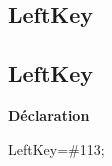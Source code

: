 \documentclass{report}
\newif\ifpdf
\begin{document}
\subsection*{\large{\textbf{LeftKey}}\normalsize\hspace{1ex}\hrulefill}
\else
\subsection*{LeftKey}
\fi
\label{Types-LeftKey}
\begin{list}{}{
\setlength{\itemindent}{0cm}
\setlength{\listparindent}{0cm}
\setlength{\leftmargin}{\evensidemargin}
\addtolength{\leftmargin}{\tmplength}
\settowidth{\labelsep}{X}
\addtolength{\leftmargin}{\labelsep}
\setlength{\labelwidth}{\tmplength}
}
\item[\textbf{Déclaration}\hfill]
\ifpdf
\begin{flushleft}
\fi
\begin{ttfamily}
LeftKey={\#}113;\end{ttfamily}

\ifpdf
\end{flushleft}
\fi

\end{list}
\end{document}
